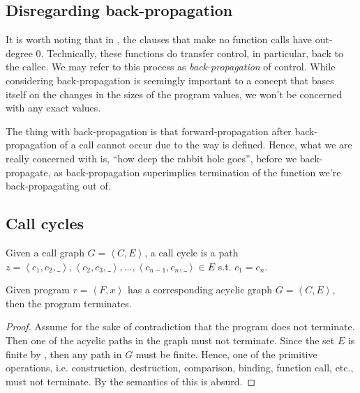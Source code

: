 \subsection{Disregarding back-propagation}

It is worth noting that in , the clauses that
make no function calls have out-degree $0$. Technically, these functions do
transfer control, in particular, back to the callee. We may refer to this
process as \emph{back-propagation} of control. While considering
back-propagation is seemingly important to a concept that bases itself on the
changes in the sizes of the program values, we won't be concerned with any
exact values.

The thing with back-propagation is that forward-propagation after
back-propagation of a call cannot occur due to the way \D{} is defined. Hence,
what we are really concerned with is, ``how deep the rabbit hole goes'', before
we back-propagate, as back-propagation superimplies termination of the function
we're back-propagating out of.

\subsection{Call cycles}

\begin{definition}\label{definition:call-cycle} Given a call graph $G =
\left\langle C,E \right\rangle$, a call cycle is a path\\ $z= \left\langle
c_1,c_2,\_ \right\rangle, \left\langle c_2,c_3,\_ \right\rangle,
\ldots,\left\langle c_{n-1}, c_n,\_ \right\rangle \in E$ s.t.
$c_1=c_n$.\end{definition}

\begin{theorem}\label{theorem:acyclic-graph-terminates} Given program $r=
\left\langle F, x \right\rangle$ has a corresponding acyclic graph $G =
\left\langle C,E \right\rangle$, then the program terminates.\end{theorem}

\begin{proof} Assume for the sake of contradiction that the program does not
terminate. Then one of the acyclic paths in the graph must not terminate. Since
the set $E$ is finite by , then any path
in $G$ must be finite.  Hence, one of the primitive operations, i.e.
construction, destruction, comparison, binding, function call, etc., must not
terminate. By the semantics of \D{} this is absurd.\end{proof}


